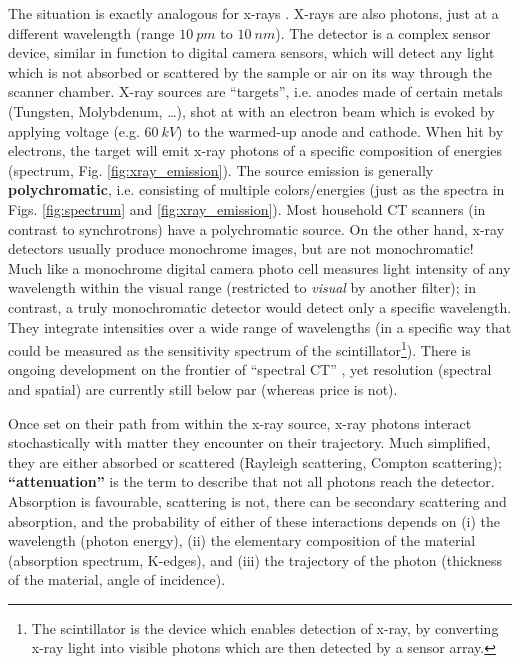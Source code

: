The situation is exactly analogous for x-rays \citep{Berger2018,Buzug2008}.
X-rays are also photons, just at a different wavelength (range \(10\ pm\) to \(10\ nm\)).
The detector is a complex sensor device, similar in function to digital camera sensors, which will detect any light which is not absorbed or scattered by the sample or air on its way through the scanner chamber.
X-ray sources are ``targets'', i.e. anodes made of certain metals (Tungsten, Molybdenum, \ldots{}), shot at with an electron beam which is evoked by applying voltage (e.g. \(60\ kV\)) to the warmed-up anode and cathode.
When hit by electrons, the target will emit x-ray photons of a specific composition of energies (spectrum, Fig. \ref{fig:xray_emission}).
The source emission is generally \textbf{polychromatic}, i.e. consisting of multiple colors/energies (just as the spectra in Figs. \ref{fig:spectrum} and \ref{fig:xray_emission}).
Most household CT scanners (in contrast to synchrotrons) have a polychromatic source.
On the other hand, x-ray detectors usually produce monochrome images, but are not monochromatic!
Much like a monochrome digital camera photo cell measures light intensity of any wavelength within the visual range (restricted to \emph{visual} by another filter); in contrast, a truly monochromatic detector would detect only a specific wavelength.
They integrate intensities over a wide range of wavelengths (in a specific way that could be measured as the sensitivity spectrum of the scintillator\footnote{The scintillator is the device which enables detection of x-ray, by converting x-ray light into visible photons which are then detected by a sensor array.}).
There is ongoing development on the frontier of ``spectral CT'' \citep{Liu2023}, yet resolution (spectral and spatial) are currently still below par (whereas price is not).


Once set on their path from within the x-ray source, x-ray photons interact stochastically with matter they encounter on their trajectory.
Much simplified, they are either absorbed or scattered (Rayleigh scattering, Compton scattering); \textbf{``attenuation''} is the term to describe that not all photons reach the detector.
Absorption is favourable, scattering is not, there can be secondary scattering and absorption, and the probability of either of these interactions depends on (i) the wavelength (photon energy), (ii) the elementary composition of the material (absorption spectrum, K-edges), and (iii) the trajectory of the photon (thickness of the material, angle of incidence).


